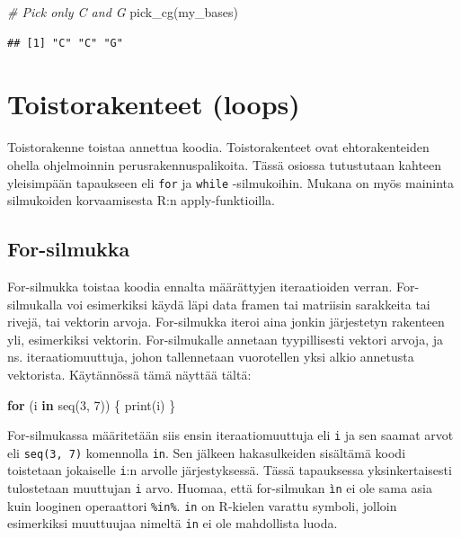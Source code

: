 \documentclass[
]{book}
\newenvironment{Shaded}{\begin{snugshade}}{\end{snugshade}}
\newcommand{\CommentTok}[1]{\textcolor[rgb]{0.56,0.35,0.01}{\textit{#1}}}
\newcommand{\ControlFlowTok}[1]{\textcolor[rgb]{0.13,0.29,0.53}{\textbf{#1}}}
\newcommand{\DecValTok}[1]{\textcolor[rgb]{0.00,0.00,0.81}{#1}}
\newcommand{\FunctionTok}[1]{\textcolor[rgb]{0.00,0.00,0.00}{#1}}
\newcommand{\NormalTok}[1]{#1}
\begin{document}
\begin{Shaded}
\begin{Highlighting}[]
\CommentTok{\# Pick only C and G}
\FunctionTok{pick\_cg}\NormalTok{(my\_bases)}
\end{Highlighting}
\end{Shaded}

\begin{verbatim}
## [1] "C" "C" "G"
\end{verbatim}

\hypertarget{loops}{%
\chapter{Toistorakenteet (loops)}\label{loops}}

Toistorakenne toistaa annettua koodia. Toistorakenteet ovat ehtorakenteiden ohella ohjelmoinnin perusrakennuspalikoita. Tässä osiossa tutustutaan kahteen yleisimpään tapaukseen eli \texttt{for} ja \texttt{while} -silmukoihin. Mukana on myös maininta silmukoiden korvaamisesta R:n apply-funktioilla.

\hypertarget{for-silmukka}{%
\section{For-silmukka}\label{for-silmukka}}

For-silmukka toistaa koodia ennalta määrättyjen iteraatioiden verran. For-silmukalla voi esimerkiksi käydä läpi data framen tai matriisin sarakkeita tai rivejä, tai vektorin arvoja. For-silmukka iteroi aina jonkin järjestetyn rakenteen yli, esimerkiksi vektorin. For-silmukalle annetaan tyypillisesti vektori arvoja, ja ns. iteraatiomuuttuja, johon tallennetaan vuorotellen yksi alkio annetusta vektorista. Käytännössä tämä näyttää tältä:

\begin{Shaded}
\begin{Highlighting}[]
\ControlFlowTok{for}\NormalTok{ (i }\ControlFlowTok{in} \FunctionTok{seq}\NormalTok{(}\DecValTok{3}\NormalTok{, }\DecValTok{7}\NormalTok{)) \{}
  \FunctionTok{print}\NormalTok{(i)}
\NormalTok{\}}
\end{Highlighting}
\end{Shaded}

For-silmukassa määritetään siis ensin iteraatiomuuttuja eli \texttt{i} ja sen saamat arvot eli \texttt{seq(3,\ 7)} komennolla \texttt{in}. Sen jälkeen hakasulkeiden sisältämä koodi toistetaan jokaiselle \texttt{i}:n arvolle järjestyksessä. Tässä tapauksessa yksinkertaisesti tulostetaan muuttujan \texttt{i} arvo. Huomaa, että for-silmukan \texttt{ìn} ei ole sama asia kuin looginen operaattori \texttt{\%in\%}. \texttt{in} on R-kielen varattu symboli, jolloin esimerkiksi muuttuujaa nimeltä \texttt{in} ei ole mahdollista luoda.
\end{document}
